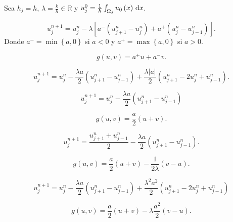 \begin{frame}

	Sea $h_{j}=h$, $\lambda=\frac{k}{h}\in\mathbb{R}$ y
	\begin{math}
		u^{0}_{j}=
		\frac{1}{h}
		\int_{\Omega_{j}}
		u_{0}\left(x\right)\dl x
	\end{math}.

	\begin{equation*}
		u^{n+1}_{j}=
		u^{n}_{j}-
		\lambda
		\left[
			a^{-}\left(u^{n}_{j+1}-u^{n}_{j}\right)+
			a^{+}\left(u^{n}_{j}-u^{n}_{j-1}\right)
			\right].
	\end{equation*}
	Donde $a^{-}=\min\left\{a,0\right\}$ si $a<0$ y $a^{+}=\max\left\{a,0\right\}$ si $a>0$.

	\begin{equation*}
		g\left(u,v\right)=
		a^{+}u+a^{-}v.
	\end{equation*}

	\begin{equation*}
		u^{n+1}_{j}=
		u^{n}_{j}-
		\frac{\lambda a}{2}
		\left(u^{n}_{j+1}-u^{n}_{j-1}\right)+
		\frac{\lambda\left|a\right|}{2}
		\left(u^{n}_{j+1}-2u^{n}_{j}+u^{n}_{j-1}\right).
	\end{equation*}

	\begin{equation*}
		u^{n+1}_{j}=
		u^{n}_{j}-
		\frac{\lambda a}{2}
		\left(u^{n}_{j+1}-u^{n}_{j-1}\right)
	\end{equation*}

	\begin{equation*}
		g\left(u,v\right)=
		\frac{a}{2}\left(u+v\right).
	\end{equation*}

	\begin{equation*}
		u^{n+1}_{j}=
		\frac{u^{n}_{j+1}+u^{n}_{j-1}}{2}-
		\frac{\lambda a}{2}
		\left(u^{n}_{j+1}-u^{n}_{j-1}\right).
	\end{equation*}

	\begin{equation*}
		g\left(u,v\right)=
		\frac{a}{2}\left(u+v\right)-
		\frac{1}{2\lambda}\left(v-u\right).
	\end{equation*}

	\begin{equation*}
		u^{n+1}_{j}=
		u^{n}_{j}-
		\frac{\lambda a}{2}
		\left(u^{n}_{j+1}-u^{n}_{j-1}\right)+
		\frac{\lambda^{2}a^{2}}{2}
		\left(u^{n}_{j+1}-2u^{n}_{j}+u^{n}_{j-1}\right)
	\end{equation*}

	\begin{equation*}
		g\left(u,v\right)=
		\frac{a}{2}\left(u+v\right)-
		\lambda\frac{a^{2}}{2}\left(v-u\right).
	\end{equation*}
\end{frame}
